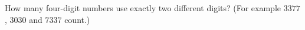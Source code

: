 How many four-digit numbers use exactly two different digits? (For example $3377$, $3030$ and $7337$ count.)
